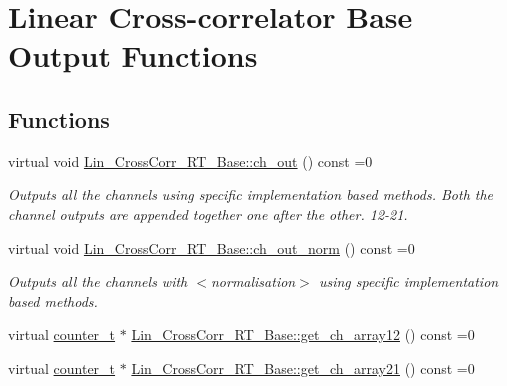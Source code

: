 \hypertarget{group__Lin__CorrCorr__Base__Out}{}\section{\textquotesingle{}\textquotesingle{}Linear Cross-\/correlator Base Output Functions\textquotesingle{}\textquotesingle{}}
\label{group__Lin__CorrCorr__Base__Out}
\subsection*{Functions}
\begin{DoxyCompactItemize}
\item 
virtual void \hyperlink{group__Lin__CorrCorr__Base__Out_ga5d7bad992e07606a18ea828aeb768e1f}{Lin\+\_\+\+Cross\+Corr\+\_\+\+R\+T\+\_\+\+Base\+::ch\+\_\+out} () const =0
\begin{DoxyCompactList}\small\item\em Outputs all the channels using specific implementation based methods. Both the channel outputs are appended together one after the other. 12-\/21. \end{DoxyCompactList}\item 
virtual void \hyperlink{group__Lin__CorrCorr__Base__Out_gaaac0e6901df27096d687c228638c012b}{Lin\+\_\+\+Cross\+Corr\+\_\+\+R\+T\+\_\+\+Base\+::ch\+\_\+out\+\_\+norm} () const =0
\begin{DoxyCompactList}\small\item\em Outputs all the channels with {\bfseries } $<$normalisation$>$ using specific implementation based methods. \end{DoxyCompactList}\item 
virtual \hyperlink{types_8hpp_ac89ac912f524b3e3fa3720ea55fec966}{counter\+\_\+t} $\ast$ \hyperlink{group__Lin__CorrCorr__Base__Out_gacc777900e8d232740373a70c1d5b4cce}{Lin\+\_\+\+Cross\+Corr\+\_\+\+R\+T\+\_\+\+Base\+::get\+\_\+ch\+\_\+array12} () const =0
\item 
virtual \hyperlink{types_8hpp_ac89ac912f524b3e3fa3720ea55fec966}{counter\+\_\+t} $\ast$ \hyperlink{group__Lin__CorrCorr__Base__Out_ga9f075c765376a156da279b23bc18c07f}{Lin\+\_\+\+Cross\+Corr\+\_\+\+R\+T\+\_\+\+Base\+::get\+\_\+ch\+\_\+array21} () const =0
\end{DoxyCompactItemize}


